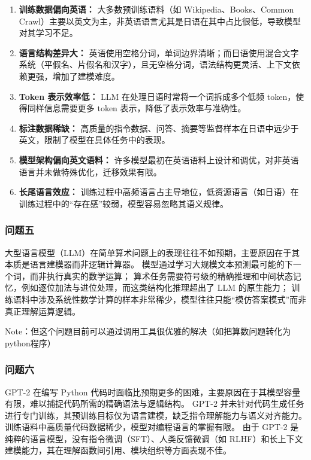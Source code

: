 \documentclass{article}
\begin{document}
\begin{enumerate}[nosep]
  \item \textbf{训练数据偏向英语：} 大多数预训练语料（如 Wikipedia、Books、Common Crawl）主要以英文为主，非英语语言尤其是日语在其中占比很低，导致模型对其学习不足。
  
  \item \textbf{语言结构差异大：} 英语使用空格分词，单词边界清晰；而日语使用混合文字系统（平假名、片假名和汉字），且无空格分词，语法结构更灵活、上下文依赖更强，增加了建模难度。
  
  \item \textbf{Token 表示效率低：} LLM 在处理日语时常将一个词拆成多个低频 token，使得同样信息需要更多 token 表示，降低了表示效率与准确性。
  
  \item \textbf{标注数据稀缺：} 高质量的指令数据、问答、摘要等监督样本在日语中远少于英文，限制了模型在具体任务中的表现。
  
  \item \textbf{模型架构偏向英文语料：} 许多模型最初在英语语料上设计和调优，对非英语语言并未做特殊优化，迁移效果有限。
  
  \item \textbf{长尾语言效应：} 训练过程中高频语言占主导地位，低资源语言（如日语）在训练过程中的“存在感”较弱，模型容易忽略其语义规律。
\end{enumerate}

\subsubsection{问题五}
大型语言模型（LLM）在简单算术问题上的表现往往不如预期，主要原因在于其本质是语言建模器而非逻辑计算器。
模型通过学习大规模文本预测最可能的下一个词，而非执行真实的数学运算；
算术任务需要符号级的精确推理和中间状态记忆，例如逐位加法与进位处理，而这类结构化推理超出了 LLM 的原生能力；
训练语料中涉及系统性数学计算的样本非常稀少，模型往往只能“模仿答案模式”而非真正理解运算逻辑。

Note：但这个问题目前可以通过调用工具很优雅的解决（如把算数问题转化为python程序）

\subsubsection{问题六}
GPT-2 在编写 Python 代码时面临比预期更多的困难，主要原因在于其模型容量有限，难以捕捉代码所需的精确语法与逻辑结构。
GPT-2 并未针对代码生成任务进行专门训练，其预训练目标仅为语言建模，缺乏指令理解能力与语义对齐能力。
训练语料中高质量代码数据稀少，模型对编程语言的掌握有限。
由于 GPT-2 是纯粹的语言模型，没有指令微调（SFT）、人类反馈微调（如 RLHF）和长上下文建模能力，其在理解函数间引用、模块组织等方面表现不佳。
\end{document}
